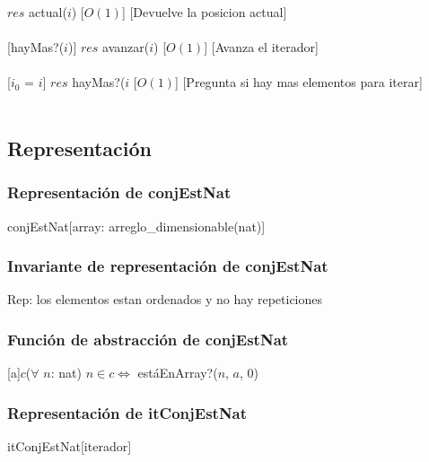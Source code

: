   {$res$ \igobs actual($i$)}
  [$O(1)$]
  [Devuelve la posicion actual]\\\\
  
  [hayMas?($i$)]
  {$res$ \igobs avanzar($i$)}
  [$O(1)$]
  [Avanza el iterador]\\\\
  
  [$i_{0}$ = $i$]
  {$res$ \igobs hayMas?($i$}
  [$O(1)$]
  [Pregunta si hay mas elementos para iterar]\\\\
\subsection{Representaci\'on}
\subsubsection{Representaci\'on de conjEstNat}
\begin{Estructura}{conjEstNat}[array: arreglo\_dimensionable(nat)]\end{Estructura}
\subsubsection{Invariante de representaci\'on de conjEstNat}
 	Rep: los elementos estan ordenados y no hay repeticiones
  \subsubsection{Funci\'on de abstracci\'on de conjEstNat}
 	[a]{$c$}{($\forall$ $n$: nat) $n \in c \Leftrightarrow$ est\'aEnArray?($n$, $a$, 0)}
 	
 	
\subsubsection{Representaci\'on de itConjEstNat}
\begin{Estructura}{itConjEstNat}[iterador]
	\begin{Tupla}[iterador]
	\end{Tupla}
\end{Estructura}
